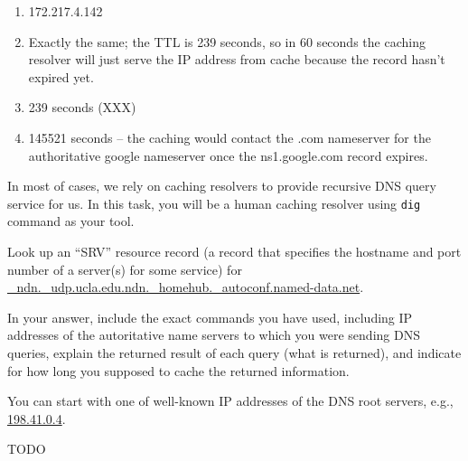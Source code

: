 \documentclass{report}
\begin{document}
\begin{problem}
\begin{enumerate}
\end{enumerate}


\begin{answer}{50em}
  \begin{enumerate}
  \item 172.217.4.142
  \item Exactly the same; the TTL is 239 seconds, so in 60 seconds the caching
        resolver will just serve the IP address from cache because the record hasn't
        expired yet.
  \item 239 seconds (XXX)
  \item 145521 seconds -- the caching would contact the .com nameserver for the
        authoritative google nameserver once the ns1.google.com record expires.
  \end{enumerate}
\end{answer}

\end{problem}


\clearpage
\begin{problem}

In most of cases, we rely on caching resolvers to provide recursive DNS query service for us.
In this task, you will be a human caching resolver using \verb|dig| command as your tool.

Look up an ``SRV'' resource record (a record that specifies the hostname and port number of a server(s) for some service) for \url{_ndn._udp.ucla.edu.ndn._homehub._autoconf.named-data.net}.

In your answer, include the exact commands you have used, including IP addresses of the autoritative name servers to which you were sending DNS queries, explain the returned result of each query (what is returned), and indicate for how long you supposed to cache the returned information.

You can start with one of well-known IP addresses of the DNS root servers, e.g., \url{198.41.0.4}.

\begin{answer}{30em}
TODO
\end{answer}

\end{problem}
\end{document}
